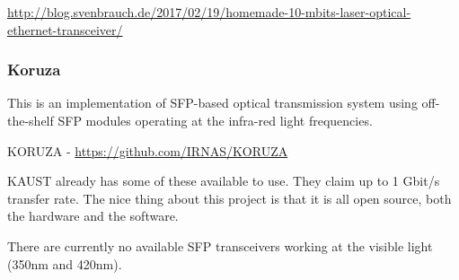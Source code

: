\url{http://blog.svenbrauch.de/2017/02/19/homemade-10-mbits-laser-optical-ethernet-transceiver/}

\subsubsection{Koruza}
This is an implementation of \ac{SFP}-based optical transmission system using
off-the-shelf \ac{SFP} modules operating at the infra-red light frequencies.

KORUZA - \url{https://github.com/IRNAS/KORUZA}

\ac{KAUST} already has some of these available to use. They claim up to
1 Gbit/s transfer rate. The nice thing about this project is that it is
all open source, both the hardware and the software.

There are currently no available \ac{SFP} transceivers working at the visible
light (350nm and 420nm).

